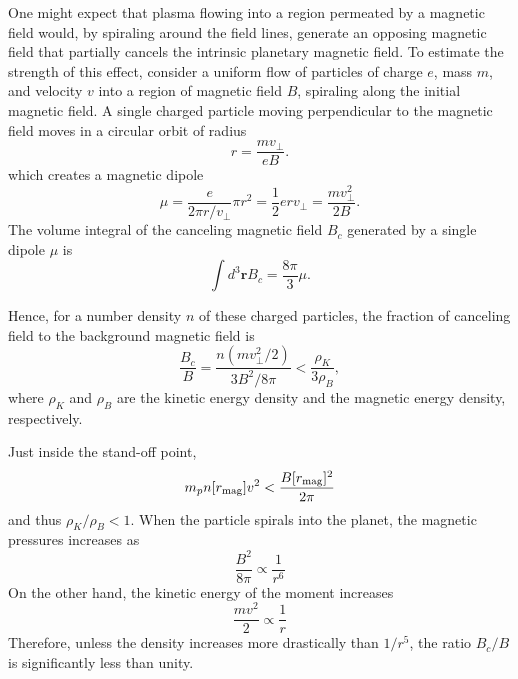 \documentclass[iop,numberedappendix,apj]{emulateapj}
\begin{document}
One might expect that plasma flowing into a region permeated by a magnetic field would, by spiraling around the field lines, generate an opposing magnetic field that partially cancels the intrinsic planetary magnetic field. 
To estimate the strength of this effect, consider a uniform flow of particles of charge $e$, mass $m$, and velocity $v$ into a region of magnetic field $B$, spiraling along the initial magnetic field. 
A single charged particle moving perpendicular to the magnetic field moves in a circular orbit of radius 
\begin{equation}
r=\frac{mv_\bot }{eB}.
\end{equation}
which creates a magnetic dipole
\begin{equation}
\mu = \frac{e}{2\pi r/v_\bot} \pi r^2 = \frac{1}{2} e r v_\bot = \frac{mv_\bot^2}{2B}.
\end{equation}
The volume integral of the canceling magnetic field $B_c$ generated by a single dipole $\mu$ is
\begin{equation}
\int d^3{\boldsymbol r} B_c = \frac{8\pi}{3} \mu.
\end{equation}

Hence, for a number density $n$ of these charged particles, the fraction of canceling field to the background magnetic field is
\begin{equation}
\frac{B_c}{B} = \frac{n(mv_\bot^2/2)}{3 B^2/8\pi} < \frac{\rho_K}{3\rho_B},
\end{equation}
where $\rho_K$ and $\rho_B$ are the kinetic energy density and the magnetic energy density, respectively. 

Just inside the stand-off point, 
\begin{equation}
m_p n[r_{\rm mag}] v^2 < \frac{B[r_{\rm mag}]^2}{2\pi }
\end{equation}
and thus $\rho_K/\rho _B < 1$. 
When the particle spirals into the planet, 
the magnetic pressures increases as 
\begin{equation}
\frac{B^2}{8\pi } \propto \frac{1}{r^6}
\end{equation}
On the other hand, the kinetic energy of the moment increases
\begin{equation}
\frac{mv^2}{2} \propto \frac{1}{r}
\end{equation}
Therefore, unless the density increases more drastically than $1/r^5$, the ratio $B_c/B$ is significantly less than unity. 
 
\end{document}
